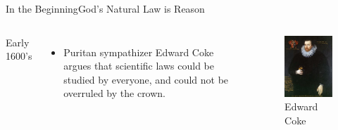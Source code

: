 \begin{frame}{In the Beginning}{God's Natural Law is Reason}
	\begin{columns}[c]
			Early 1600's
			\begin{itemize}
				\item Puritan sympathizer Edward Coke argues that scientific laws could be studied by everyone, and could not be overruled by the crown.
			\end{itemize}
			\begin{figure}
				\centering
				\includegraphics[width=\textwidth]{images/edward_coke}
				\caption{Edward Coke}
			\end{figure}
	\end{columns}
\end{frame}

